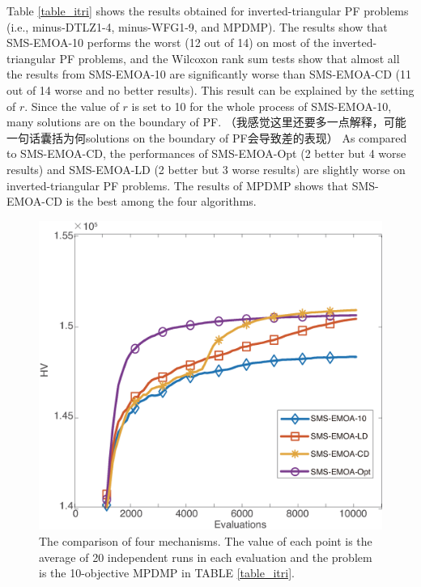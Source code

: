\documentclass[conference]{IEEEtran}
\begin{document}
Table \ref{table_itri} shows the results obtained for inverted-triangular PF problems 
(i.e., minus-DTLZ1-4, minus-WFG1-9, and MPDMP). 
The results show that SMS-EMOA-10 performs the worst (12 out of 14) on most of the inverted-triangular PF problems, 
and the Wilcoxon rank sum tests show that almost all the results from SMS-EMOA-10 are significantly worse than SMS-EMOA-CD 
(11 out of 14 worse and no better results). 
This result can be explained by the setting of $r$. Since the value of $r$ is set to 10 for the whole process of SMS-EMOA-10, many solutions are on the boundary of PF. 
（我感觉这里还要多一点解释，可能一句话囊括为何solutions on the boundary of PF会导致差的表现）
As compared to SMS-EMOA-CD, the performances of SMS-EMOA-Opt (2 better but 4 worse results) and SMS-EMOA-LD (2 better but 3 worse results) are slightly worse on inverted-triangular PF problems. 
The results of MPDMP shows that SMS-EMOA-CD is the best among the four algorithms. 

\begin{figure}[!t]
  \centering
    \includegraphics[width=\columnwidth]{SMSEMOA_MPDMP_hv_2}
  \caption{The comparison of four mechanisms. %
  The value of each point is the average of 20 independent runs in each evaluation
  and the problem is the 10-objective MPDMP in TABLE \ref{table_itri}. 
  }
  \label{crdmp}
\end{figure}
\end{document}
